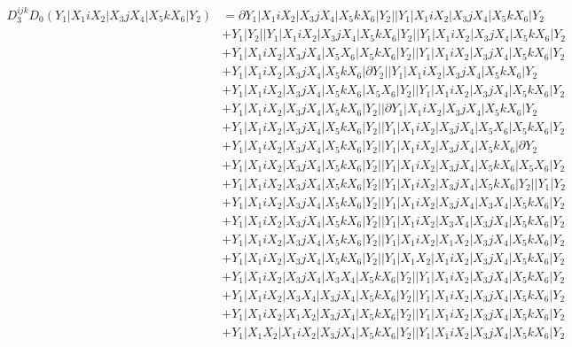\documentclass{article}[12pt]
\begin{document}
\begin{align*}
D_3^{ijk}D_0(Y_1|X_1iX_2|X_3jX_4|X_5kX_6|Y_2)& =\partial Y_1|X_1iX_2|X_3jX_4|X_5kX_6|Y_2||Y_1|X_1iX_2|X_3jX_4|X_5kX_6|Y_2\\ 
 & +Y_1|Y_2||Y_1|X_1iX_2|X_3jX_4|X_5kX_6|Y_2||Y_1|X_1iX_2|X_3jX_4|X_5kX_6|Y_2\\ 
 & +Y_1|X_1iX_2|X_3jX_4|X_5X_6|X_5kX_6|Y_2||Y_1|X_1iX_2|X_3jX_4|X_5kX_6|Y_2\\ 
 & +Y_1|X_1iX_2|X_3jX_4|X_5kX_6|\partial Y_2||Y_1|X_1iX_2|X_3jX_4|X_5kX_6|Y_2\\ 
 & +Y_1|X_1iX_2|X_3jX_4|X_5kX_6|X_5X_6|Y_2||Y_1|X_1iX_2|X_3jX_4|X_5kX_6|Y_2\\ 
 & +Y_1|X_1iX_2|X_3jX_4|X_5kX_6|Y_2||\partial Y_1|X_1iX_2|X_3jX_4|X_5kX_6|Y_2\\ 
 & +Y_1|X_1iX_2|X_3jX_4|X_5kX_6|Y_2||Y_1|X_1iX_2|X_3jX_4|X_5X_6|X_5kX_6|Y_2\\ 
 & +Y_1|X_1iX_2|X_3jX_4|X_5kX_6|Y_2||Y_1|X_1iX_2|X_3jX_4|X_5kX_6|\partial Y_2\\ 
 & +Y_1|X_1iX_2|X_3jX_4|X_5kX_6|Y_2||Y_1|X_1iX_2|X_3jX_4|X_5kX_6|X_5X_6|Y_2\\ 
 & +Y_1|X_1iX_2|X_3jX_4|X_5kX_6|Y_2||Y_1|X_1iX_2|X_3jX_4|X_5kX_6|Y_2||Y_1|Y_2\\ 
 & +Y_1|X_1iX_2|X_3jX_4|X_5kX_6|Y_2||Y_1|X_1iX_2|X_3jX_4|X_3X_4|X_5kX_6|Y_2\\ 
 & +Y_1|X_1iX_2|X_3jX_4|X_5kX_6|Y_2||Y_1|X_1iX_2|X_3X_4|X_3jX_4|X_5kX_6|Y_2\\ 
 & +Y_1|X_1iX_2|X_3jX_4|X_5kX_6|Y_2||Y_1|X_1iX_2|X_1X_2|X_3jX_4|X_5kX_6|Y_2\\ 
 & +Y_1|X_1iX_2|X_3jX_4|X_5kX_6|Y_2||Y_1|X_1X_2|X_1iX_2|X_3jX_4|X_5kX_6|Y_2\\ 
 & +Y_1|X_1iX_2|X_3jX_4|X_3X_4|X_5kX_6|Y_2||Y_1|X_1iX_2|X_3jX_4|X_5kX_6|Y_2\\ 
 & +Y_1|X_1iX_2|X_3X_4|X_3jX_4|X_5kX_6|Y_2||Y_1|X_1iX_2|X_3jX_4|X_5kX_6|Y_2\\ 
 & +Y_1|X_1iX_2|X_1X_2|X_3jX_4|X_5kX_6|Y_2||Y_1|X_1iX_2|X_3jX_4|X_5kX_6|Y_2\\ 
 & +Y_1|X_1X_2|X_1iX_2|X_3jX_4|X_5kX_6|Y_2||Y_1|X_1iX_2|X_3jX_4|X_5kX_6|Y_2\end{align*}
 
 
\end{document}
